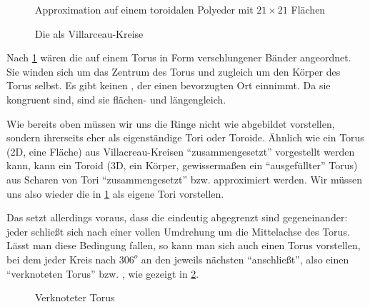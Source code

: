 \begin{figure}[ht!] 
    \centering
                        
    \caption{Die  als Villarceau-Kreise} Approximation auf einem toroidalen Polyeder mit $21\times21$ Flächen
    \label{fig:villarceautorous}
\end{figure}


Nach \cref{fig:villarceautorous} wären die  auf einem Torus in Form verschlungener Bänder angeordnet. Sie winden sich um das Zentrum des Torus und zugleich um den Körper des Torus selbst. 
Es gibt keinen , der einen bevorzugten Ort einnimmt. Da sie kongruent sind, sind sie flächen- und längengleich.


Wie bereits oben müssen wir uns die Ringe nicht wie abgebildet vorstellen, sondern ihrerseits eher als eigenständige Tori oder Toroide. Ähnlich wie ein Torus (2D, eine Fläche) aus Villacreau-Kreisen "`zusammengesetzt"' vorgestellt werden kann, kann ein Toroid (3D, ein Körper, gewissermaßen ein "`ausgefüllter"' Torus) aus Scharen von Tori "`zusammengesetzt"' bzw. approximiert werden. Wir müssen uns also wieder die  in \cref{fig:villarceautorous} als eigene Tori vorstellen.

Das setzt allerdings voraus, dass die  eindeutig abgegrenzt sind gegeneinander: jeder  schließt sich nach einer vollen Umdrehung um die Mittelachse des Torus. Lässt man diese Bedingung fallen, so kann man sich auch einen Torus vorstellen, bei dem jeder Kreis nach $306^o$ an den jeweils nächsten "`anschließt"', also einen "`verknoteten Torus"' bzw. , wie gezeigt in \cref{fig:knottedtorus}.

\begin{figure}
    \centering
    \caption{Verknoteter Torus \cite{knottedtorus}}
    \label{fig:knottedtorus}
\end{figure}

